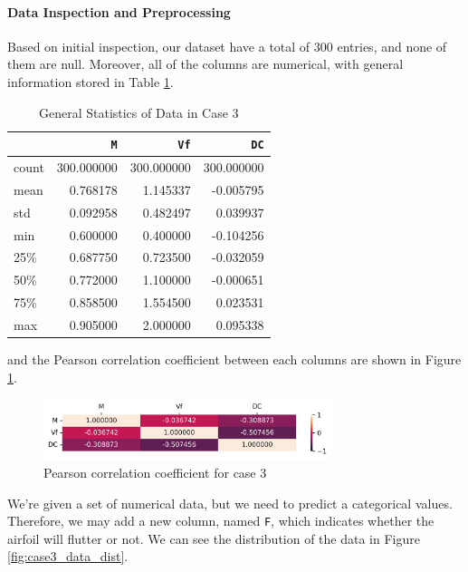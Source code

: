 \documentclass[conf]{new-aiaa}
\begin{document}
\paragraph{Data Inspection and Preprocessing}
Based on initial inspection, our dataset have a total of 300 entries, and none of them are null. Moreover, all of the columns are numerical, with general information stored in Table \ref{tab:case3_data_info}. 
\begin{table}[H]
    \centering
    \caption{ \label{tab:case3_data_info}General Statistics of Data in Case 3}
    \begin{tabular}{lrrr} 
        \toprule
        {} &           \texttt{M} &          \texttt{Vf} &          \texttt{DC} \\
        \midrule
        count &  300.000000 &  300.000000 &  300.000000 \\
        mean  &    0.768178 &    1.145337 &   -0.005795 \\
        std   &    0.092958 &    0.482497 &    0.039937 \\
        min   &    0.600000 &    0.400000 &   -0.104256 \\
        25\%   &    0.687750 &    0.723500 &   -0.032059 \\
        50\%   &    0.772000 &    1.100000 &   -0.000651 \\
        75\%   &    0.858500 &    1.554500 &    0.023531 \\
        max   &    0.905000 &    2.000000 &    0.095338 \\
        \bottomrule
    \end{tabular}
\end{table}
and the Pearson correlation coefficient between each columns are shown in Figure \ref{fig:case3_corr_heatmap}.
\begin{figure}[H]
    \centering
    \includegraphics[width=0.75\textwidth]{graph/case3_corr_heatmap.png}
    \caption{Pearson correlation coefficient for case 3}
    \label{fig:case3_corr_heatmap}
\end{figure}
We're given a set of numerical data, but we need to predict a categorical values. Therefore, we may add a new column, named \texttt{F}, which indicates whether the airfoil will flutter or not. We can see the distribution of the data in Figure \ref{fig:case3_data_dist}.
\end{document}
